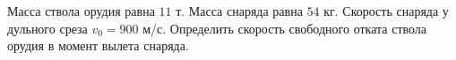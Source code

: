 Масса ствола орудия равна $11$ т. Масса снаряда равна $54$ кг. Скорость снаряда у дульного среза $v_{0}=900$ м/с. 
Определить скорость свободного отката ствола орудия в момент вылета снаряда.
